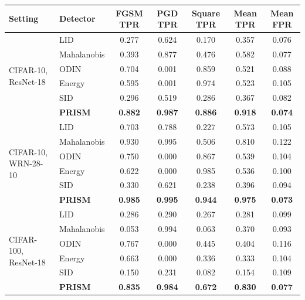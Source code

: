 \begin{tabular}{llccccc}
\toprule
Setting & Detector & FGSM TPR & PGD TPR & Square TPR & Mean TPR & Mean FPR \\
\midrule
\multirow{6}{*}{CIFAR-10, ResNet-18}
 & LID            & 0.277 & 0.624 & 0.170 & 0.357 & 0.076 \\
 & Mahalanobis    & 0.393 & 0.877 & 0.476 & 0.582 & 0.077 \\
 & ODIN           & 0.704 & 0.001 & 0.859 & 0.521 & 0.088 \\
 & Energy         & 0.595 & 0.001 & 0.974 & 0.523 & 0.105 \\
 & SID            & 0.296 & 0.519 & 0.286 & 0.367 & 0.082 \\
 & \textbf{PRISM} & \textbf{0.882} & \textbf{0.987} & \textbf{0.886} & \textbf{0.918} & \textbf{0.074} \\
\midrule
\multirow{6}{*}{CIFAR-10, WRN-28-10}
 & LID            & 0.703 & 0.788 & 0.227 & 0.573 & 0.105 \\
 & Mahalanobis    & 0.930 & 0.995 & 0.506 & 0.810 & 0.122 \\
 & ODIN           & 0.750 & 0.000 & 0.867 & 0.539 & 0.104 \\
 & Energy         & 0.622 & 0.000 & 0.985 & 0.536 & 0.100 \\
 & SID            & 0.330 & 0.621 & 0.238 & 0.396 & 0.094 \\
 & \textbf{PRISM} & \textbf{0.985} & \textbf{0.995} & \textbf{0.944} & \textbf{0.975} & \textbf{0.073} \\
\midrule
\multirow{6}{*}{CIFAR-100, ResNet-18}
 & LID            & 0.286 & 0.290 & 0.267 & 0.281 & 0.099 \\
 & Mahalanobis    & 0.053 & 0.994 & 0.063 & 0.370 & 0.093 \\
 & ODIN           & 0.767 & 0.000 & 0.445 & 0.404 & 0.116 \\
 & Energy         & 0.663 & 0.000 & 0.336 & 0.333 & 0.104 \\
 & SID            & 0.150 & 0.231 & 0.082 & 0.154 & 0.109 \\
 & \textbf{PRISM} & \textbf{0.835} & \textbf{0.984} & \textbf{0.672} & \textbf{0.830} & \textbf{0.077} \\
\bottomrule
\end{tabular}
